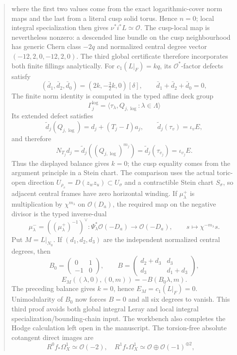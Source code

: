 \documentclass[11pt,letterpaper]{article}
\theoremstyle{definition}
\theoremstyle{remark}
\begin{document}
\begin{abstract}
\[\]
where the first two values come from the exact logarithmic-cover norm maps
and the last from a literal cusp solid torus.  Hence $n=0$; local integral
specialization then gives $\nu^*i^*L\simeq\mathcal O$.
The cusp-local map is nevertheless nonzero: a descended line bundle on the
cusp neighbourhood has generic Chern class $-2q$ and normalized central
degree vector $(-12,2,0,-12,2,0)$.  The third global certificate therefore
incorporates both finite fillings analytically.  For $c_1(L|_F)=kq$, its
$\mathcal O^*$-factor defects satisfy
\[
 (\bar d_1,\bar d_2,\bar d_0)=(2k,-\tfrac32k,0)[\delta],
 \qquad \bar d_1+\bar d_2+\bar d_0=0,
\]
The finite norm identity is computed in the typed affine deck group
\[
 \Gamma_j^{\log}
 =\langle\tau_\lambda,Q_{j,\log}:\lambda\in\Lambda\rangle
\]
Its extended defect satisfies
\[
 \widetilde d_j(Q_{j,\log})=d_j+(T_j-I)a_j,\qquad
 \widetilde d_j(\tau_v)=\iota_vE,
\]
and therefore
\[
 N_{T_j}d_j
 =\widetilde d_j((Q_{j,\log})^{m_j})
 =\widetilde d_j(\tau_{v_j})=\iota_{v_j}E.
\]
Thus the displayed balance gives \(k=0\); the cusp equality comes from the
argument principle in a Stein chart.  The comparison uses the actual
toric-open direction
 $U_{\rho_v}=D(z_wz_u)\subset U_\sigma$ and a contractible Stein chart
 $S_\sigma$, so adjacent central frames have zero horizontal winding.  If
 $\mu^+_\lambda$ is multiplication by $\chi^{m_\lambda}$ on
 $\mathcal O(D_a)$, the required map on the negative divisor is the typed
 inverse-dual
 \[
  \mu^-_\lambda=((\mu^+_\lambda)^{-1})^\vee:
  \Psi_\lambda^*\mathcal O(-D_a)\longrightarrow\mathcal O(-D_a),
  \qquad s\longmapsto\chi^{-m_\lambda}s.
 \]
Put \(M=L|_{N_0}\).  If $(d_1,d_2,d_3)$ are the independent normalized
central degrees, then
\[
 B_0=\begin{pmatrix}0&1\\-1&0\end{pmatrix},\qquad
 B=\begin{pmatrix}d_2+d_3&d_3\\d_3&d_1+d_3\end{pmatrix},
\]
\[
 E_M((\lambda,0),(0,m))=-B(B_0\lambda,m).
\]
The preceding balance gives \(k=0\), hence \(E_M=c_1(L|_F)=0\).
Unimodularity of $B_0$ now forces $B=0$ and all six degrees to vanish.  This
third proof avoids both global integral Leray and local integral
specialization/bounding-chain input.
The workbench also completes the Hodge calculation left open in the
manuscript.  The torsion-free absolute cotangent direct images are
\[
R^0f_*\Omega_X^1\simeq\mathcal O(-2),\quad
R^1f_*\Omega_X^1\simeq\mathcal O\oplus\mathcal O(-1)^{\oplus2},\quad
\]
\end{abstract}
\end{document}
